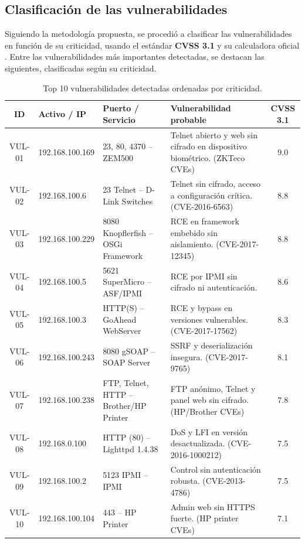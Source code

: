 \documentclass[a4paper, 11pt]{article}
\begin{document}
\subsection*{Clasificación de las vulnerabilidades}

Siguiendo la metodología propuesta, se procedió a clasificar las vulnerabilidades en función de su criticidad, usando el estándar \textbf{CVSS 3.1} y su calculadora oficial \cite{cvsscalc}. Entre las vulnerabilidades más importantes detectadas, se destacan las siguientes, clasificadas según su criticidad.


\begin{table}[H]
\centering
\small
\begin{tabular}{|c|p{2.5cm}|p{2.8cm}|p{5.2cm}|c|}
\hline
\rowcolor{gray!20}
\textbf{ID} & \textbf{Activo / IP} & \textbf{Puerto / Servicio} & \textbf{Vulnerabilidad probable} & \textbf{CVSS 3.1} \\
\hline
\rowcolor{cvsscritical!70}
VUL-01 & 192.168.100.169 & 23, 80, 4370 – ZEM500 & Telnet abierto y web sin cifrado en dispositivo biométrico. (ZKTeco CVEs) & 9.0 \\
\rowcolor{cvsshigh!70}
VUL-02 & 192.168.100.6 & 23 Telnet – D-Link Switches & Telnet sin cifrado, acceso a configuración crítica. (CVE-2016-6563) & 8.8 \\
\rowcolor{cvsshigh!70}
VUL-03 & 192.168.100.229 & 8080 Knopflerfish – OSGi Framework & RCE en framework embebido sin aislamiento. (CVE-2017-12345) & 8.8 \\
\rowcolor{cvsshigh!70}
VUL-04 & 192.168.100.5 & 5621 SuperMicro – ASF/IPMI & RCE por IPMI sin cifrado ni autenticación. & 8.6 \\
\rowcolor{cvsshigh!70}
VUL-05 & 192.168.100.3 & HTTP(S) – GoAhead WebServer & RCE y bypass en versiones vulnerables. (CVE-2017-17562) & 8.3 \\
\rowcolor{cvsshigh!70}
VUL-06 & 192.168.100.243 & 8080 gSOAP – SOAP Server & SSRF y deserialización insegura. (CVE-2017-9765) & 8.1 \\
\rowcolor{cvssmedium!70}
VUL-07 & 192.168.100.238 & FTP, Telnet, HTTP – Brother/HP Printer & FTP anónimo, Telnet y panel web sin cifrado. (HP/Brother CVEs) & 7.8 \\
\rowcolor{cvssmedium!70}
VUL-08 & 192.168.0.100 & HTTP (80) – Lighttpd 1.4.38 & DoS y LFI en versión desactualizada. (CVE-2016-1000212) & 7.5 \\
\rowcolor{cvssmedium!70}
VUL-09 & 192.168.100.2 & 5123 IPMI – IPMI & Control sin autenticación robusta. (CVE-2013-4786) & 7.5 \\
\rowcolor{cvssmedium!70}
VUL-10 & 192.168.100.104 & 443 – HP Printer & Admin web sin HTTPS fuerte. (HP printer CVEs) & 7.1 \\
\hline
\end{tabular}
\caption{Top 10 vulnerabilidades detectadas ordenadas por criticidad.}
\label{tab:vulnstop10}
\end{table}
\end{document}
